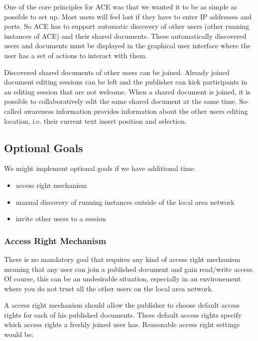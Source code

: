 \documentclass[11pt,a4paper]{article}
\begin{document}
One of the core principles for ACE was that we wanted it to be as simple as possible to set up. Most users
will feel lost if they have to enter IP addresses and ports. So ACE has to support automatic discovery
of other users (other running instances of ACE) and their shared documents. These automatically discovered
users and documents must be displayed in the graphical user interface where the user has a set of actions
to interact with them.

Discovered shared documents of other users can be joined. Already joined document editing sessions can
be left and the publisher can kick participants in an editing session that are not welcome. When a shared
document is joined, it is possible to collaboratively edit the same shared document at the same time. 
So-called awareness information provides information about the other users editing location, i.e. their
current text insert position and selection.


\subsection{Optional Goals}

We might implement optional goals if we have additional time.

\begin{itemize}
 \item access right mechanism
 \item manual discovery of running instances outside of the local area network
 \item invite other users to a session 
\end{itemize}

\subsubsection{Access Right Mechanism}

There is no mandatory goal that requires any kind of access right mechanism meaning that any user can join a published
document and gain read/write access. Of course, this can be an undesirable situation, especially in an environement
where you do not trust all the other users on the local area network.

A access right mechanism should allow the publisher to choose default access rights for each of his published 
documents. These default access rights specify which access rights a freshly joined user has.
Reasonable access right settings would be:
\end{document}
